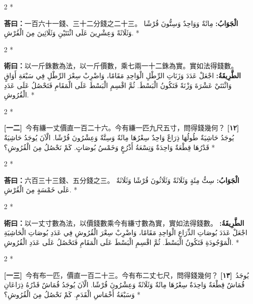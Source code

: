 \documentclass[11pt,a4paper]{article}
\newcommand{\ar}[1]{\arabicfont\beginR #1\endR}
\newcommand{\problemnum}[1]{\textbf{[\ignorespaces#1\unskip]}}
\newenvironment{bilingual}{%
  \begin{paracol}{2}%
  \switchcolumn[0]*%
}{%
  \end{paracol}%
}
\newcommand{\cnline}[1]{\switchcolumn[0]\noindent #1 \switchcolumn[1]}
\newcommand{\arline}[1]{\noindent\ar{#1} \switchcolumn[0]*}
\newenvironment{prob bilingual}{%
  \begin{paracol}{2}%
  \switchcolumn[0]*%
}{%
  \end{paracol}%
  \vspace{0.3em}%
}
\begin{document}
\begin{bilingual}
\cnline{\textcolor{answercolor}{\textbf{荅曰：}}一百六十一錢、三十二分錢之二十三。}
\arline{\textcolor{answercolor}{\textbf{الْجَوَابُ:}} مِائَةٌ وَوَاحِدٌ وَسِتُّونَ قُرْشًا وَثَلَاثَةً وَعِشْرِينَ عَلَى اثْنَتَيْنِ وَثَلَاثِينَ مِنَ الْقُرْشِ.}
\end{bilingual}

\begin{bilingual}
\cnline{%
\textcolor{methodcolor}{\textbf{術曰：}}以一斤銖數為法，以一斤價數，乘七兩一十二銖為實。實如法得錢數。
}
\arline{%
\textcolor{methodcolor}{\textbf{الطَّرِيقَةُ:}} اجْعَلْ عَدَدَ وَزَنَاتِ الرِّطْلِ الْوَاحِدِ مَقَامًا، وَاضْرِبْ سِعْرَ الرِّطْلِ فِي سَبْعَةِ أَوَاقٍ وَاثْنَتَيْ عَشْرَةَ وَزْنَةً فَتَكُونُ الْبَسْطَ. ثُمَّ اقْسِمِ الْبَسْطَ عَلَى الْمَقَامِ فَتَحْصُلُ عَلَى عَدَدِ الْقُرُوشِ.
}
\end{bilingual}

\begin{bilingual}
\cnline{\problemnum{一二}\, 今有縑一丈價直一百二十六。今有縑一匹九尺五寸，問得錢幾何？}
\arline{\problemnum{١٢}\, يُوجَدُ حَاشِيَةٌ طُولُهَا ذِرَاعٌ وَاحِدٌ سِعْرُهَا مِائَةٌ وَسِتَّةٌ وَعِشْرُونَ قُرْشًا. الْآنَ يُوجَدُ حَاشِيَةٌ قَدْرُهَا قِطْعَةٌ وَاحِدَةٌ وَتِسْعَةُ أَذْرُعٍ وَخَمْسُ بُوصَاتٍ. كَمْ نَحْصُلُ مِنَ الْقُرُوشِ؟}
\end{bilingual}

\begin{bilingual}
\cnline{\textcolor{answercolor}{\textbf{荅曰：}}六百三十三錢、五分錢之三。}
\arline{\textcolor{answercolor}{\textbf{الْجَوَابُ:}} سِتُّ مِئَةٍ وَثَلَاثَةٌ وَثَلَاثُونَ قُرْشًا وَثَلَاثَةٌ عَلَى خَمْسَةٍ مِنَ الْقُرْشِ.}
\end{bilingual}

\begin{bilingual}
\cnline{%
\textcolor{methodcolor}{\textbf{術曰：}}以一丈寸數為法，以價錢數乘今有縑寸數為實，實如法得錢數。
}
\arline{%
\textcolor{methodcolor}{\textbf{الطَّرِيقَةُ:}} اجْعَلْ عَدَدَ بُوصَاتِ الذِّرَاعِ الْوَاحِدِ مَقَامًا، وَاضْرِبْ سِعْرَ الْقُرُوشِ فِي عَدَدِ بُوصَاتِ الْحَاشِيَةِ الْمَوْجُودَةِ فَتَكُونُ الْبَسْطَ. ثُمَّ اقْسِمِ الْبَسْطَ عَلَى الْمَقَامِ فَتَحْصُلُ عَلَى عَدَدِ الْقُرُوشِ.
}
\end{bilingual}

\begin{bilingual}
\cnline{\problemnum{一三}\, 今有布一匹，價直一百二十三。今有布二丈七尺，問得錢幾何？}
\arline{\problemnum{١٣}\, يُوجَدُ قُمَاشٌ قِطْعَةٌ وَاحِدَةٌ سِعْرُهَا مِائَةٌ وَثَلَاثَةٌ وَعِشْرُونَ قُرْشًا. الْآنَ يُوجَدُ قُمَاشٌ قَدْرُهُ ذِرَاعَانِ وَسَبْعَةُ أَخْمَاسِ الْقَدَمِ. كَمْ نَحْصُلُ مِنَ الْقُرُوشِ؟}
\end{bilingual}
\end{document}
